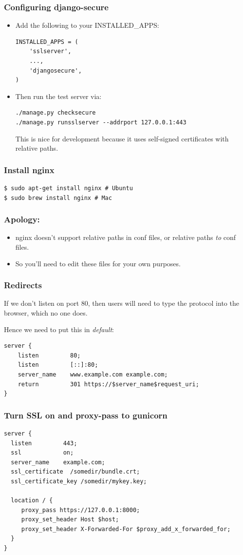 \documentclass[9pt]{beamer}
\begin{document}
\begin{frame}[fragile]
\frametitle{Configuring django-secure}
\begin{itemize}
\item Add the following to your INSTALLED\_APPS:
\begin{verbatim}
INSTALLED_APPS = (
    'sslserver',
    ...,
    'djangosecure',
)
\end{verbatim}
\pause
\item Then run the test server via:
\begin{verbatim}
./manage.py checksecure 
./manage.py runsslserver --addrport 127.0.0.1:443
\end{verbatim}
This is nice for development because it uses self-signed certificates with relative paths.
\end{itemize}
\end{frame}

\begin{frame}[fragile]
\frametitle{Install nginx}
\begin{verbatim}
$ sudo apt-get install nginx # Ubuntu
$ sudo brew install nginx # Mac
\end{verbatim}
\end{frame}

\begin{frame}[fragile]
\frametitle{Apology:}
\begin{itemize}
\item nginx doesn't support relative paths in conf files, or relative paths \emph{to} conf files.

\item So you'll need to edit these files for your own purposes.
\end{itemize}
\end{frame}

\begin{frame}[fragile]
\frametitle{Redirects}
If we don't listen on port 80, then users will need to type the protocol into the browser, which no one does. 

Hence we need to put this in \emph{default}:
\begin{verbatim}
server {
    listen         80;
    listen         [::]:80;
    server_name    www.example.com example.com;
    return         301 https://$server_name$request_uri;
}
\end{verbatim}
\end{frame}

\begin{frame}[fragile]
\frametitle{Turn SSL on and proxy-pass to gunicorn}
\begin{verbatim}
server {
  listen         443;
  ssl            on;
  server_name    example.com;
  ssl_certificate  /somedir/bundle.crt;
  ssl_certificate_key /somedir/mykey.key;

  location / {
     proxy_pass https://127.0.0.1:8000;
     proxy_set_header Host $host;
     proxy_set_header X-Forwarded-For $proxy_add_x_forwarded_for;
  }
}
\end{verbatim}
\end{frame}
\end{document}
